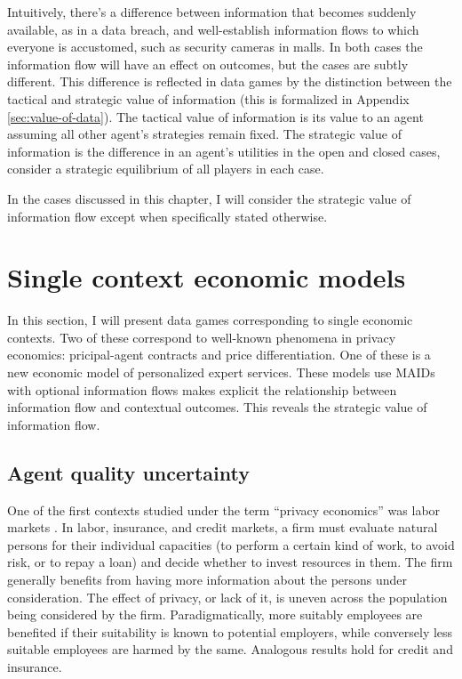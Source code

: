 \documentclass[../thesis.tex]{subfiles}
\begin{document}
Intuitively, there's a difference between information that
becomes suddenly available, as in a data breach, and
well-establish information flows to which everyone is
accustomed, such as security cameras in malls.
In both cases the information flow will have an effect on
outcomes, but the cases are subtly different.
This difference is reflected in data games by
the distinction between the
tactical and strategic
value of information (this is formalized in Appendix
\ref{sec:value-of-data}).
The tactical value of information is its value to an agent
assuming all other agent's strategies remain fixed.
The strategic value of information is the difference
in an agent's utilities in the open and closed cases,
consider a strategic equilibrium of all players in each case.

In the cases discussed in this chapter, I will consider
the strategic value of information flow except when specifically
stated otherwise.


\section{Single context economic models}
\label{sec:single-context}

In this section, I will present data games corresponding
to single economic contexts.
Two of these correspond to well-known
phenomena in privacy economics: pricipal-agent contracts
and price differentiation.
One of these is a new economic model of
personalized expert services.
These models
use MAIDs with optional information flows
makes explicit the relationship
between information flow and contextual outcomes.
This reveals the strategic value of information flow.

\subsection{Agent quality uncertainty}
\label{sec:agent-quality}

One of the first contexts studied under the
term ``privacy economics'' was labor
markets \cite{posner1981economics}.
In labor, insurance, and credit markets,
a firm must evaluate natural persons
for their individual capacities (to perform a certain kind
of work, to avoid risk, or to repay a loan) and decide
whether to invest resources in them.
The firm generally benefits from having more information
about the persons under consideration.
The effect of privacy, or lack of it, is uneven across
the population being considered by the firm.
Paradigmatically, more suitably employees are benefited
if their suitability is known to potential employers,
while conversely less suitable employees are harmed
by the same.
Analogous results hold for credit and insurance.
\end{document}
